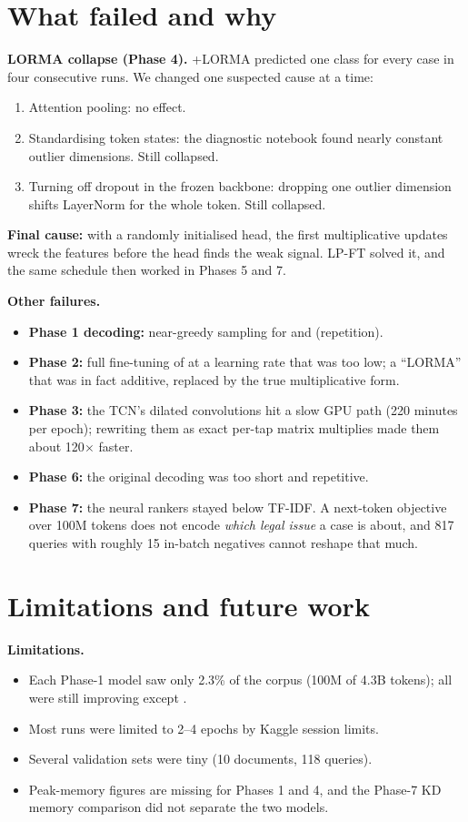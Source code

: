 \section{What failed and why}\label{sec:failed}
\textbf{LORMA collapse (Phase 4).} \A{}+LORMA predicted one class for every case in four consecutive runs. We changed one suspected cause at a time:
\begin{enumerate}
\item Attention pooling: no effect.
\item Standardising token states: the diagnostic notebook found nearly constant outlier dimensions. Still collapsed.
\item Turning off dropout in the frozen backbone: dropping one outlier dimension shifts LayerNorm for the whole token. Still collapsed.
\end{enumerate}
\textbf{Final cause:} with a randomly initialised head, the first multiplicative updates wreck the features before the head finds the weak signal. LP-FT solved it, and the same schedule then worked in Phases 5 and 7.

\textbf{Other failures.}
\begin{itemize}
\item \textbf{Phase 1 decoding:} near-greedy sampling for \A{} and \C{} (repetition).
\item \textbf{Phase 2:} full fine-tuning of \A{} at a learning rate that was too low; a ``LORMA'' that was in fact additive, replaced by the true multiplicative form.
\item \textbf{Phase 3:} the TCN's dilated convolutions hit a slow GPU path (220 minutes per epoch); rewriting them as exact per-tap matrix multiplies made them about 120$\times$ faster.
\item \textbf{Phase 6:} the original decoding was too short and repetitive.
\item \textbf{Phase 7:} the neural rankers stayed below TF-IDF. A next-token objective over 100M tokens does not encode \emph{which legal issue} a case is about, and 817 queries with roughly 15 in-batch negatives cannot reshape that much.
\end{itemize}

\section{Limitations and future work}
\textbf{Limitations.}
\begin{itemize}
\item Each Phase-1 model saw only 2.3\% of the corpus (100M of 4.3B tokens); all were still improving except \A.
\item Most runs were limited to 2--4 epochs by Kaggle session limits.
\item Several validation sets were tiny (10 documents, 118 queries).
\item Peak-memory figures are missing for Phases 1 and 4, and the Phase-7 KD memory comparison did not separate the two models.
\end{itemize}

